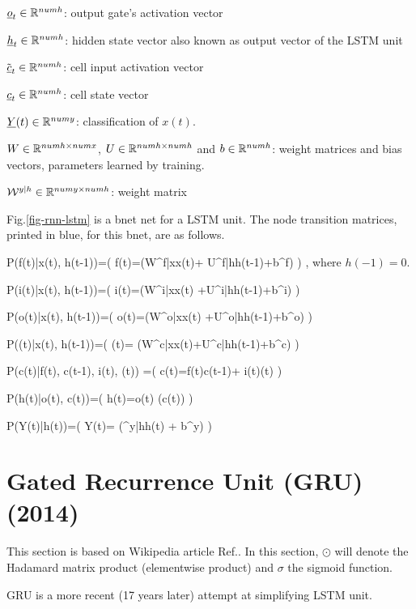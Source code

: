 ${\underline{o}}_{t}\in { \mathbb{R}}^{numh}$: 
output gate's activation vector

${\underline{h}}_{t}\in { \mathbb{R}}^{numh}$: 
hidden state vector also known as
 output vector of the LSTM unit

${\tilde {{\underline{c}}}}_{t}\in { \mathbb{R}}^{numh}$: 
cell input activation vector

${\underline{c}}_{t}\in { \mathbb{R}}^{numh}$: 
cell state vector

${\underline{Y}}(t)\in { \mathbb{R}}^{numy}$: 
classification of $x(t)$.

$W\in { \mathbb{R}}^{numh\times numx}$, 
$U\in { \mathbb{R}}^{numh\times numh}$
and 
$b\in { \mathbb{R}}^{numh}$: 
weight matrices and bias vectors,
 parameters learned by training.

${\cal W}^{y|h}\in { \mathbb{R}}^{numy\times numh}$:
 weight matrix


Fig.\ref{fig-rnn-lstm}
is a bnet net
for a LSTM unit.
The node transition matrices, printed in blue,
for this bnet, are
as follows.

\beq\color{blue}
P(f(t)|x(t), h(t-1))=\indi(\;\;\;
f(t)=\sigma(W^{f|x}x(t)+
U^{f|h}h(t-1)+b^{f})
\;\;\;)
\;,
\eeq
where $h(-1)=0$.

\beq\color{blue}
P(i(t)|x(t), h(t-1))=\indi(\;\;\;
i(t)=\sigma(W^{i|x}x(t)
+U^{i|h}h(t-1)+b^{i})
\;\;\;)
\eeq

\beq\color{blue}
P(o(t)|x(t), h(t-1))=\indi(\;\;\;
o(t)=\sigma(W^{o|x}x(t)
+U^{o|h}h(t-1)+b^{o})
\;\;\;)
\eeq

\beq\color{blue}
P((t)|x(t), h(t-1))=\indi(\;\;\;
(t)=\tanh
(W^{c|x}x(t)+U^{c|h}h(t-1)+b^{c})
\;\;\;)
\eeq

\beq\color{blue}
P(c(t)|f(t), c(t-1), i(t),
 (t))
=\indi(\;\;\;
c(t)=f(t)\odot c(t-1)+
i(t)(t)
\;\;\;)
\eeq

\beq\color{blue}
P(h(t)|o(t), c(t))=\indi(\;\;\;
h(t)=o(t)\odot \tanh
(c(t))
\;\;\;)
\eeq



\beq\color{blue}
P(Y(t)|h(t))=\indi(\;\;\;
Y(t)= \cala(\calw^{y|h}h(t) + b^y)
\;\;\;)
\eeq

\newpage
\section*{Gated Recurrence Unit
 (GRU) (2014)}

This 
section is based 
on Wikipedia article Ref.\cite{gru}. In this section,
$\odot$
will denote the Hadamard matrix product
(elementwise product)  
and $\sigma$ the sigmoid function.

GRU is a more recent (17 years later)
attempt at simplifying LSTM unit.

